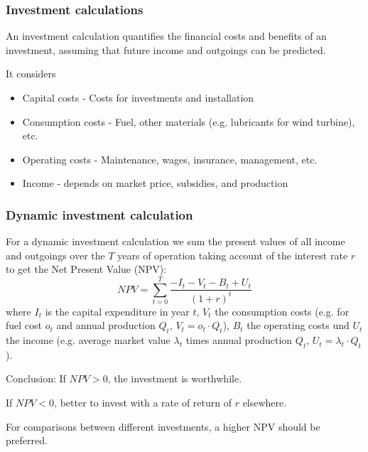 \documentclass[10pt,aspectratio=169,dvipsnames]{beamer}
\let\olditem\item
\renewcommand{\item}{%
\olditem\vspace{5pt}}
\begin{document}
\begin{frame}
  \frametitle{Investment calculations}

  An \alert{investment calculation} quantifies the financial costs and benefits of an investment, assuming that future income and outgoings can be predicted.

  It considers
  \begin{itemize}
  \item \alert{Capital costs} - Costs for investments and installation
  \item \alert{Consumption costs} - Fuel, other materials (e.g. lubricants for wind turbine), etc.
  \item \alert{Operating costs} - Maintenance, wages, insurance, management, etc.
  \item \alert{Income} - depends on market price, subsidies, and production
  \end{itemize}

\end{frame}



\begin{frame}
  \frametitle{Dynamic investment calculation}

  For a \alert{dynamic investment calculation} we sum the present values of all income and outgoings over the $T$ years of operation taking account of the interest rate $r$ to get the \alert{Net Present Value (NPV)}:
  \begin{equation*}
    NPV = \sum_{t=0}^T \frac{ - I_t - V_t - B_t + U_t}{(1+r)^t}
  \end{equation*}
  where $I_t$ is the capital expenditure in year $t$, $V_t$ the
  consumption costs (e.g. for fuel cost $o_t$ and annual production $Q_t$, $V_t = o_t\cdot Q_t$), $B_t$ the operating costs und $U_t$ the income (e.g. average market value $\lambda_t$ times annual production
  $Q_t$, $U_t = \lambda_t\cdot Q_t$).

  \alert{Conclusion:} If $NPV > 0$, the investment is worthwhile.

  If $NPV < 0$, better to invest with a rate of return of $r$ elsewhere.

  For comparisons between different investments, a higher NPV should be preferred.
\end{frame}
\end{document}
